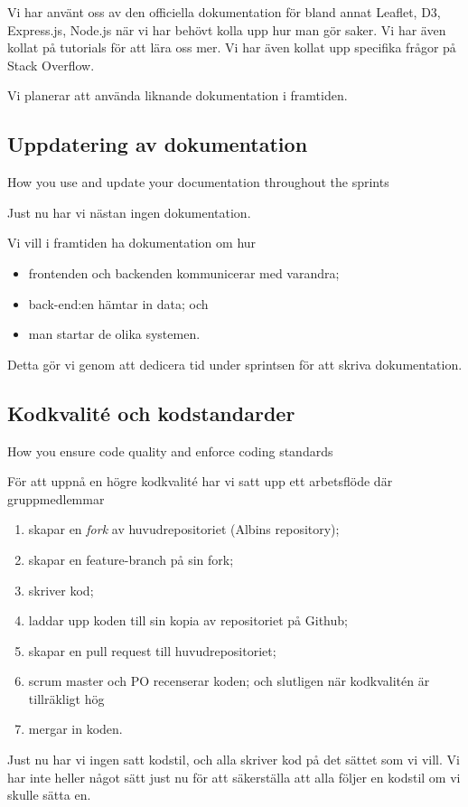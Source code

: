 \documentclass{scrartcl}
\begin{document}
Vi har använt oss av den officiella dokumentation för bland annat Leaflet, D3, Express.js, Node.js när vi har behövt kolla upp hur man gör saker. Vi har även kollat på tutorials för att lära oss mer. Vi har även kollat upp specifika frågor på Stack Overflow.

Vi planerar att använda liknande dokumentation i framtiden.

\subsection{Uppdatering av dokumentation}

\begin{displayquote}
    How you use and update your documentation throughout the sprints
\end{displayquote}

Just nu har vi nästan ingen dokumentation.

Vi vill i framtiden ha dokumentation om hur

\begin{itemize}
    \item frontenden och backenden kommunicerar med varandra;
    \item back-end:en hämtar in data; och
    \item man startar de olika systemen.
\end{itemize}

Detta gör vi genom att dedicera tid under sprintsen för att skriva dokumentation.

\subsection{Kodkvalité och kodstandarder}

\begin{displayquote}
    How you ensure code quality and enforce coding standards
\end{displayquote}

För att uppnå en högre kodkvalité har vi satt upp ett arbetsflöde där gruppmedlemmar

\begin{enumerate}
    \item skapar en \emph{fork} av huvudrepositoriet (Albins repository);
    \item skapar en feature-branch på sin fork;
    \item skriver kod;
    \item laddar upp koden till sin kopia av repositoriet på Github;
    \item skapar en pull request till huvudrepositoriet;
    \item scrum master och PO recenserar koden; och slutligen när kodkvalitén är tillräkligt hög
    \item mergar in koden.
\end{enumerate}
Just nu har vi ingen satt kodstil, och alla skriver kod på det sättet som vi vill.
Vi har inte heller något sätt just nu för att säkerställa att alla följer en kodstil om vi skulle sätta en.
\end{document}
